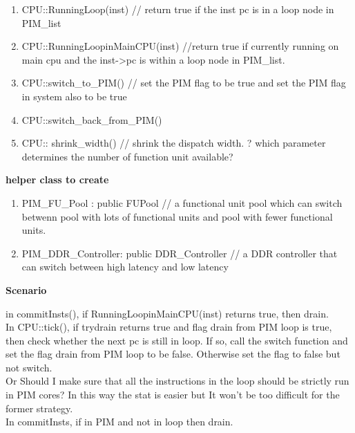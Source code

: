 \documentclass[11pt]{article}
\begin{document}
\begin{enumerate}
	\item CPU::RunningLoop(inst) // return true if the inst pc is in a loop node in PIM\_list

	\item CPU::RunningLoopinMainCPU(inst) //return true if currently running on main cpu and the inst-\textgreater pc is within a loop node in PIM\_list.
	
	\item CPU::switch\_to\_PIM() // set the PIM flag to be true and set the PIM flag in system also to be true
	
	\item CPU::switch\_back\_from\_PIM()
	
	\item CPU:: shrink\_width() // shrink the dispatch width. ? which parameter determines the number of function unit available?
\end{enumerate}

\textbf{helper class to create}

\begin{enumerate}
	\item PIM\_FU\_Pool : public FUPool // a functional unit pool which can switch betwenn pool with lots of functional units and pool with fewer functional units.
	
	\item PIM\_DDR\_Controller: public DDR\_Controller // a DDR controller that can switch between high latency and low latency
\end{enumerate}

\textbf{Scenario\\}

in commitInsts(), if RunningLoopinMainCPU(inst) returns true, then drain.\\

In CPU::tick(), if trydrain returns true and flag drain from PIM loop is true, then check whether the next pc is still in loop. If so, call the switch function and set the flag drain from PIM loop to be false. Otherwise set the flag to false but not switch.\\

Or Should I make sure that all the instructions in the loop should be strictly run in PIM cores? In this way the stat is easier but It won't be too difficult for the former strategy.\\

In commitInsts, if in PIM and not in loop then drain.\\ 
\end{document}
